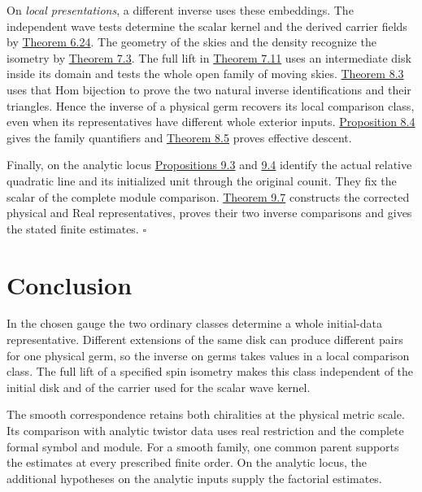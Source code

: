 \documentclass[
  english,
  11pt,
  reqno]{amsart}
\begin{document}
On \emph{local presentations}, a different inverse uses these
embeddings. The independent wave tests determine the scalar kernel and
the derived carrier fields by
\hyperref[thm:online-wave-enrichment-recognition]{Theorem 6.24}. The
geometry of the skies and the density recognize the isometry by
\hyperref[thm:online-incidence-physical-recognition]{Theorem 7.3}. The
full lift in \hyperref[thm:online-full-unmarked-source-hom]{Theorem
7.11} uses an intermediate disk inside its domain and tests the whole
open family of moving skies. \hyperref[thm:local-two-inverses]{Theorem
8.3} uses that Hom bijection to prove the two natural inverse
identifications and their triangles. Hence the inverse of a physical
germ recovers its local comparison class, even when its representatives
have different whole exterior inputs.
\hyperref[prop:local-inverse-families]{Proposition 8.4} gives the family
quantifiers and \hyperref[thm:local-display-atlas-descent]{Theorem 8.5}
proves effective descent.

Finally, on the analytic locus
\hyperref[prop:relative-residue-calibration]{Propositions 9.3} and
\hyperref[prop:initialized-analytic-unit]{9.4} identify the actual
relative quadratic line and its initialized unit through the original
counit. They fix the scalar of the complete module comparison.
\hyperref[thm:analytic-structured-wave-comparison]{Theorem 9.7}
constructs the corrected physical and Real representatives, proves their
two inverse comparisons and gives the stated finite estimates.
\hfill\(\square\)

\section{Conclusion}\label{conclusion}\label{sec:conclusion}

In the chosen gauge the two ordinary classes determine a whole
initial-data representative. Different extensions of the same disk can
produce different pairs for one physical germ, so the inverse on germs
takes values in a local comparison class. The full lift of a specified
spin isometry makes this class independent of the initial disk and of
the carrier used for the scalar wave kernel.

The smooth correspondence retains both chiralities at the physical
metric scale. Its comparison with analytic twistor data uses real
restriction and the complete formal symbol and module. For a smooth
family, one common parent supports the estimates at every prescribed
finite order. On the analytic locus, the additional hypotheses on the
analytic inputs supply the factorial estimates.
\end{document}

